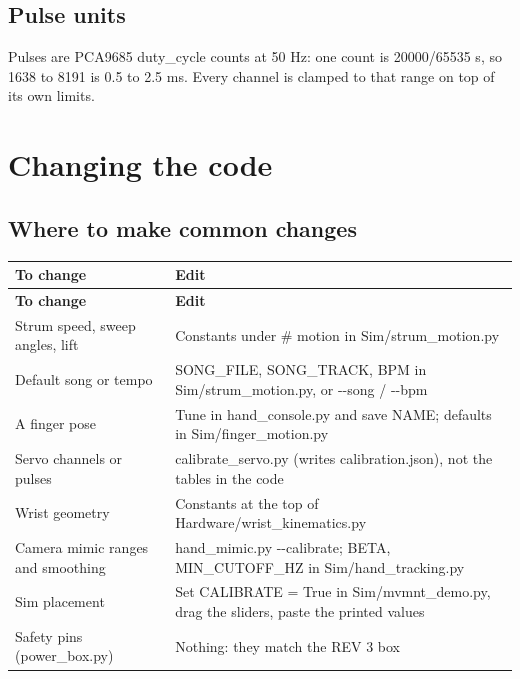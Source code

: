 \documentclass[11pt,letterpaper]{article}
\newcommand{\code}[1]{\textcolor{codeblue}{\ttfamily\smaller\relax #1}}
\begin{document}
\subsection{Pulse units}
Pulses are PCA9685 \code{duty\_\allowbreak{}cycle} counts at 50 Hz: one count is 20000/65535 \textmu{}s, so 1638 to 8191 is 0.5 to 2.5 ms. Every channel is clamped to that range on top of its own limits.


\section{Changing the code}

\subsection{Where to make common changes}
{\small
\begin{longtable}{|>{\raggedright\arraybackslash}p{}|>{\raggedright\arraybackslash}p{}|}
\hline
\rowcolor{tblhead}\textbf{To change} & \textbf{Edit} \\ \hline
\endfirsthead
\hline
\rowcolor{tblhead}\textbf{To change} & \textbf{Edit} \\ \hline
\endhead
Strum speed, sweep angles, lift & Constants under \code{\# motion} in \code{Sim/\allowbreak{}strum\_\allowbreak{}motion.py} \\ \hline
Default song or tempo & \code{SONG\_\allowbreak{}FILE}, \code{SONG\_\allowbreak{}TRACK}, \code{BPM} in \code{Sim/\allowbreak{}strum\_\allowbreak{}motion.py}, or \code{-{}-{}song} / \code{-{}-{}bpm} \\ \hline
A finger pose & Tune in \code{hand\_\allowbreak{}console.py} and \code{save NAME}; defaults in \code{Sim/\allowbreak{}finger\_\allowbreak{}motion.py} \\ \hline
Servo channels or pulses & \code{calibrate\_\allowbreak{}servo.py} (writes \code{calibration.json}), not the tables in the code \\ \hline
Wrist geometry & Constants at the top of \code{Hardware/\allowbreak{}wrist\_\allowbreak{}kinematics.py} \\ \hline
Camera mimic ranges and smoothing & \code{hand\_\allowbreak{}mimic.py -{}-{}calibrate}; \code{BETA}, \code{MIN\_\allowbreak{}CUTOFF\_\allowbreak{}HZ} in \code{Sim/\allowbreak{}hand\_\allowbreak{}tracking.py} \\ \hline
Sim placement & Set \code{CALIBRATE =\allowbreak{} True} in \code{Sim/\allowbreak{}mvmnt\_\allowbreak{}demo.py}, drag the sliders, paste the printed values \\ \hline
Safety pins (\code{power\_\allowbreak{}box.py}) & Nothing: they match the REV 3 box \\ \hline
\end{longtable}}
\end{document}
